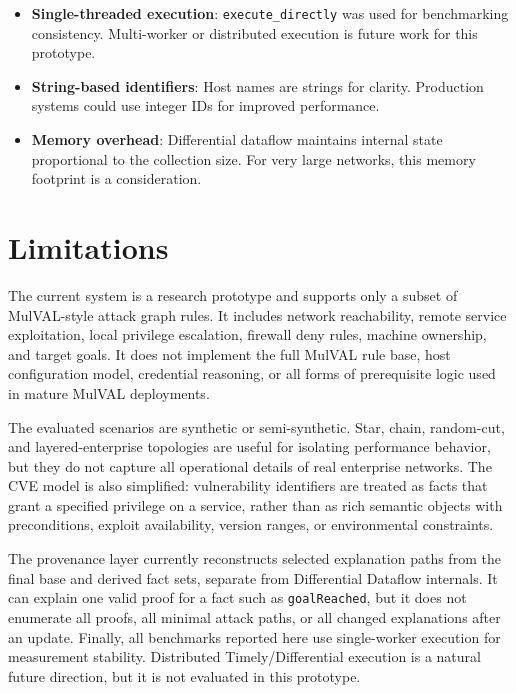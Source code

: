 \documentclass[conference]{IEEEtran}
\begin{document}
\begin{itemize}
    \item \textbf{Single-threaded execution}: \texttt{execute\_directly} was used for benchmarking consistency. Multi-worker or distributed execution is future work for this prototype.
    \item \textbf{String-based identifiers}: Host names are strings for clarity. Production systems could use integer IDs for improved performance.
    \item \textbf{Memory overhead}: Differential dataflow maintains internal state proportional to the collection size. For very large networks, this memory footprint is a consideration.
\end{itemize}

\section{Limitations}

The current system is a research prototype and supports only a subset of
MulVAL-style attack graph rules. It includes network reachability, remote
service exploitation, local privilege escalation, firewall deny rules, machine
ownership, and target goals. It does not implement the full MulVAL rule base,
host configuration model, credential reasoning, or all forms of prerequisite
logic used in mature MulVAL deployments.

The evaluated scenarios are synthetic or semi-synthetic. Star, chain,
random-cut, and layered-enterprise topologies are useful for isolating
performance behavior, but they do not capture all operational details of real
enterprise networks. The CVE model is also simplified: vulnerability identifiers
are treated as facts that grant a specified privilege on a service, rather than
as rich semantic objects with preconditions, exploit availability, version
ranges, or environmental constraints.

The provenance layer currently reconstructs selected explanation paths from the
final base and derived fact sets, separate from Differential Dataflow internals.
It can explain one valid proof for a fact such as \texttt{goalReached}, but it
does not enumerate all proofs, all minimal attack paths, or all changed
explanations after an update. Finally, all
benchmarks reported here use single-worker execution for measurement stability.
Distributed Timely/Differential execution is a natural future direction, but it
is not evaluated in this prototype.
\end{document}
